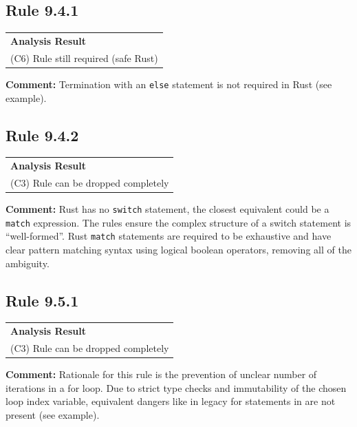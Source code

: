 \subsection*{Rule 9.4.1}
\begin{longtable}{p{13cm}}
\textbf{Analysis Result} \\
(C6) Rule still required (safe Rust) \\
\end{longtable}
\textbf{Comment:} Termination with an \texttt{else} statement is not required in Rust (see example). \\


\subsection*{Rule 9.4.2}
\begin{longtable}{p{13cm}}
\textbf{Analysis Result} \\
(C3) Rule can be dropped completely \\
\end{longtable}
\textbf{Comment:} Rust has no \texttt{switch} statement, the closest equivalent could be a \texttt{match} expression. The rules ensure the complex structure of a switch statement is ``well-formed''. Rust \texttt{match} statements are required to be exhaustive and have clear pattern matching syntax using logical boolean operators, removing all of the ambiguity. \\


\subsection*{Rule 9.5.1}
\begin{longtable}{p{13cm}}
\textbf{Analysis Result} \\
(C3) Rule can be dropped completely \\
\end{longtable}
\textbf{Comment:} Rationale for this rule is the prevention of unclear number of iterations in a for loop. Due to strict type checks and immutability of the chosen loop index variable, equivalent dangers like in legacy for statements in \Cpp are not present (see example). \\


